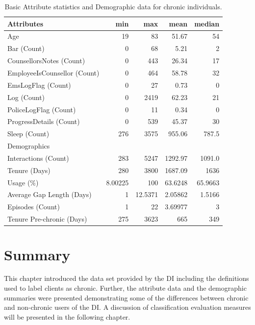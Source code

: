 \begin{table}[h]
	\centering

	\begin{tabular}{lrrrr}
	\toprule
	Attributes &      min &      max &     mean &   median \\
	\midrule
	Age                          &       19 &       83 &    51.67 &       54 \\
	Bar (Count)                  &        0 &       68 &     5.21 &        2 \\
	CounsellorsNotes (Count)     &        0 &      443 &    26.34 &       17 \\
	EmployeeIsCounsellor (Count) &        0 &      464 &    58.78 &       32 \\
	EmsLogFlag (Count)           &        0 &       27 &     0.73 &        0 \\
	Log (Count)                  &        0 &     2419 &    62.23 &       21 \\
	PoliceLogFlag (Count)        &        0 &       11 &     0.34 &        0 \\
	ProgressDetails (Count)      &        0 &      539 &    45.37 &       30 \\
	Sleep (Count)                &      276 &     3575 &   955.06 &    787.5 \\
	\midrule
	Demographics								 &         &    &      &    \\
	\midrule
	Interactions (Count)         &      283 &     5247 &  1292.97 &   1091.0 \\
	Tenure (Days)                &      280 &     3800 &  1687.09 &     1636 \\
	Usage (\%)                    &  8.00225 &      100 &  63.6248 &  65.9663 \\
	Average Gap Length (Days)    &        1 &  12.5371 &  2.05862 &   1.5166 \\
	Episodes (Count)             &        1 &       22 &  3.69977 &        3 \\
	Tenure Pre-chronic (Days)    &      275 &     3623 &  665     &      349 \\
	\bottomrule
	\end{tabular}


	\caption{Basic Attribute statistics and Demographic data for chronic individuals.}
	\label{tbl:stats:chronic}
\end{table}


\section{Summary}

This chapter introduced the data set provided by the DI including the definitions used to label clients as chronic. Further, the attribute data and the demographic summaries were presented demonstrating some of the differences between chronic and non-chronic users of the DI. A discussion of classification evaluation measures will be presented in the following chapter.
